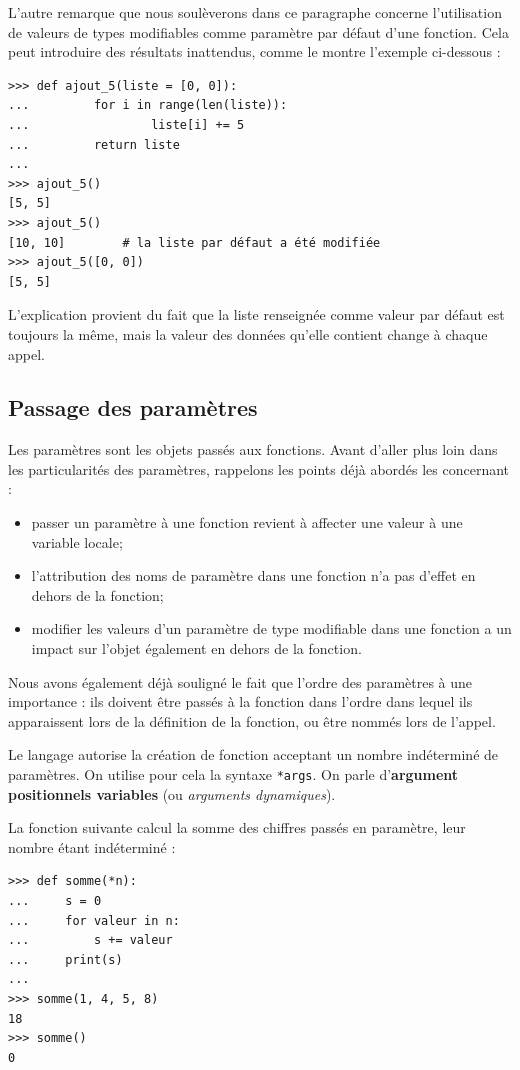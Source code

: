 \documentclass[12pt, a4paper]{article}
\begin{document}
L'autre remarque que nous soulèverons dans ce paragraphe concerne l'utilisation de valeurs de types modifiables comme paramètre par défaut d'une fonction. Cela peut introduire des résultats inattendus, comme le montre l'exemple ci-dessous :
\begin{lstlisting}
>>> def ajout_5(liste = [0, 0]):
...			for i in range(len(liste)):
...					liste[i] += 5
... 		return liste
...
>>> ajout_5()
[5, 5]
>>> ajout_5()
[10, 10]		# la liste par défaut a été modifiée
>>> ajout_5([0, 0])
[5, 5]
\end{lstlisting}

L'explication provient du fait que la liste renseignée comme valeur par défaut est toujours la même, mais la valeur des données qu'elle contient change à chaque appel.


\subsection{Passage des paramètres}
Les paramètres sont les objets passés aux fonctions. Avant d'aller plus loin dans les particularités des paramètres, rappelons les points déjà abordés les concernant :
\begin{itemize}
	\item passer un paramètre à une fonction revient à affecter une valeur à une variable locale; 
	\item l'attribution des noms de paramètre dans une fonction n'a pas d'effet en dehors de la fonction;
	\item modifier les valeurs d'un paramètre de type modifiable dans une fonction a un impact sur l'objet également en dehors de la fonction.
\end{itemize}

Nous avons également déjà souligné le fait que l'ordre des paramètres à une importance : ils doivent être passés à la fonction dans l'ordre dans lequel ils apparaissent lors de la définition de la fonction, ou être nommés lors de l'appel.

Le langage autorise la création de fonction acceptant un nombre indéterminé de paramètres. On utilise pour cela la syntaxe \lstinline{*args}. On parle d'\textbf{argument positionnels variables} (ou \textit{arguments dynamiques}).

La fonction suivante calcul la somme des chiffres passés en paramètre, leur nombre étant indéterminé :
\begin{lstlisting}
>>> def somme(*n):
...     s = 0
...     for valeur in n:
...         s += valeur
...     print(s)
...
>>> somme(1, 4, 5, 8)
18
>>> somme()
0
\end{lstlisting}
\end{document}
